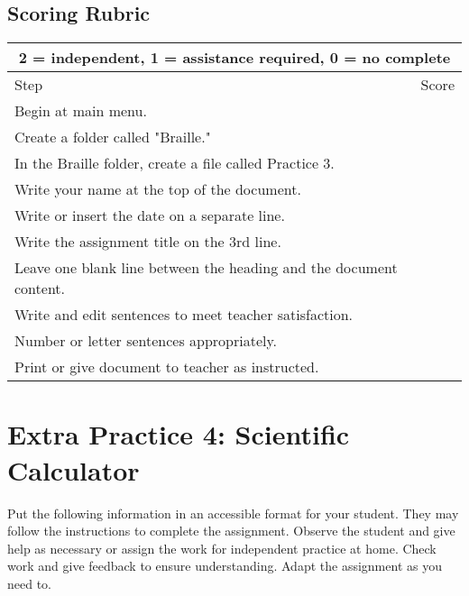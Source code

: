 \documentclass[10pt,letterpaper,twoside]{report}
\begin{document}
{{\subsection{Scoring Rubric}
{
\renewcommand{\arraystretch}{1.5}
\begin{table}[!htbp]
	\centering
	\begin{tabular}{|l|r|}
		\hline
		\multicolumn{2}{|c|}{2 = independent, 1 = assistance required, 0 = no complete} \\
		\hline
		Step                                                               & Score \\[.5em]
		\hline
		Begin at main menu.                                                &       \\ \hline	
		Create a folder called "Braille."                                  &       \\ \hline	
		In the Braille folder, create a file called Practice 3.            &       \\ \hline		
		Write your name at the top of the document.                        &       \\ \hline		
		Write or insert the date on a separate line.                       &       \\ \hline		
		Write the assignment title on the 3rd line.                        &       \\ \hline		
		Leave one blank line between the heading and the document content. &       \\ \hline		
		Write and edit sentences to meet teacher satisfaction.             &       \\ \hline		
		Number or letter sentences appropriately.                          &       \\ \hline
		Print or give document to teacher as instructed.                   &       \\ \hline
	\end{tabular}
	
\end{table}

\clearpage
\section{Extra Practice 4: Scientific Calculator}
Put the following information in an accessible format for your student. They may follow the instructions to complete the assignment. Observe the student and give help as necessary or assign the work for independent practice at home. Check work and give feedback to ensure understanding. Adapt the assignment as you need to.
}}}
\end{document}
